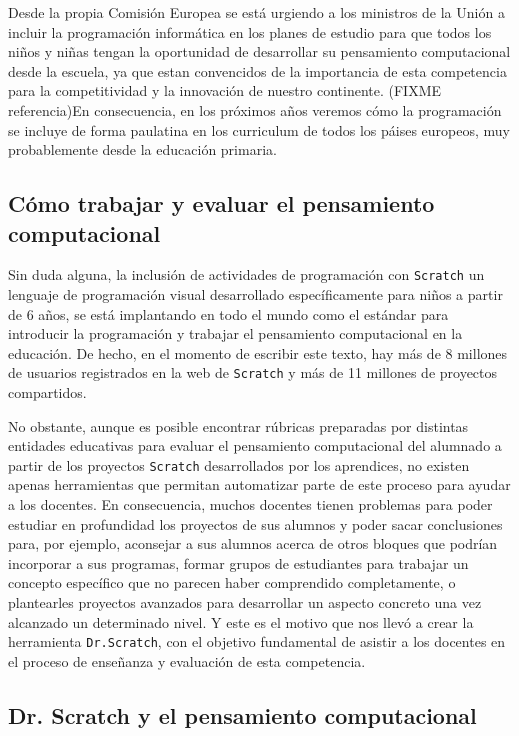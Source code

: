 \documentclass[a4paper,10pt]{article}
\begin{document}
Desde la propia Comisión Europea se está urgiendo a los ministros de la Unión a incluir la programación informática en los planes de estudio para que todos los niños y niñas tengan la oportunidad de desarrollar su pensamiento computacional desde la escuela, ya que estan convencidos de la importancia de esta competencia para la competitividad y la innovación de nuestro continente. (FIXME referencia)En consecuencia, en los próximos años veremos cómo la programación se incluye de forma paulatina en los curriculum de todos los páises europeos, muy probablemente desde la educación primaria.

\subsection*{Cómo trabajar y evaluar el pensamiento computacional}
Sin duda alguna, la inclusión de actividades de programación con \texttt{Scratch} un lenguaje de programación visual desarrollado específicamente para niños a partir de 6 años, se está implantando en todo el mundo como el estándar para introducir la programación y trabajar el pensamiento computacional en la educación. De hecho, en el momento de escribir este texto, hay más de 8 millones de usuarios registrados en la web de \texttt{Scratch} y más de 11 millones de proyectos compartidos.

No obstante, aunque es posible encontrar rúbricas preparadas por distintas entidades educativas para evaluar el pensamiento computacional del alumnado a partir de los proyectos \texttt{Scratch} desarrollados por los aprendices, no existen apenas herramientas que permitan automatizar parte de este proceso para ayudar a los docentes. En consecuencia, muchos docentes tienen problemas para poder estudiar en profundidad los proyectos de sus alumnos y poder sacar conclusiones para, por ejemplo, aconsejar a sus alumnos acerca de otros bloques que podrían incorporar a sus programas, formar grupos de estudiantes para trabajar un concepto específico que no parecen haber comprendido completamente, o plantearles proyectos avanzados para desarrollar un aspecto concreto una vez alcanzado un determinado nivel. Y este es el motivo que nos llevó a crear la herramienta \texttt{Dr.Scratch}, con el objetivo fundamental de asistir a los docentes en el proceso de enseñanza y evaluación de esta competencia.

\subsection*{Dr. Scratch y el pensamiento computacional}
\end{document}

